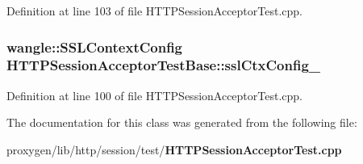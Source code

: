 Definition at line 103 of file H\+T\+T\+P\+Session\+Acceptor\+Test.\+cpp.

\subsubsection[{ssl\+Ctx\+Config\+\_\+}]{\setlength{\rightskip}{0pt plus 5cm}wangle\+::\+S\+S\+L\+Context\+Config H\+T\+T\+P\+Session\+Acceptor\+Test\+Base\+::ssl\+Ctx\+Config\+\_\+\hspace{0.3cm}{\ttfamily [protected]}}\label{classHTTPSessionAcceptorTestBase_ab311f7850c8f9742b64a9893c6e8de6a}


Definition at line 100 of file H\+T\+T\+P\+Session\+Acceptor\+Test.\+cpp.



The documentation for this class was generated from the following file\+:\begin{DoxyCompactItemize}
\item 
proxygen/lib/http/session/test/{\bf H\+T\+T\+P\+Session\+Acceptor\+Test.\+cpp}\end{DoxyCompactItemize}
